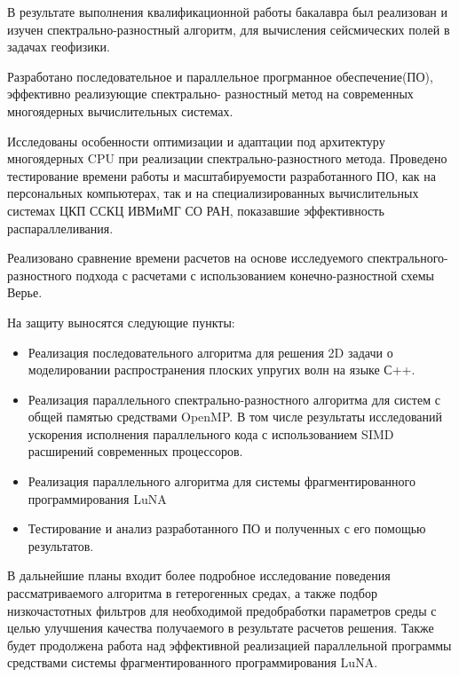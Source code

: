 
В результате выполнения квалификационной работы бакалавра был реализован и изучен спектрально-разностный алгоритм,
для вычисления сейсмических полей в задачах геофизики.

Разработано последовательное и параллельное прогрманное обеспечение(ПО), эффективно реализующие спектрально-
разностный метод на современных многоядерных вычислительных системах.

Исследованы особенности оптимизации и адаптации под архитектуру многоядерных CPU при реализации спектрально-разностного метода. Проведено тестирование времени работы и масштабируемости разработанного ПО, как на персональных компьютерах,
так и на специализированных вычислительных системах ЦКП ССКЦ ИВМиМГ СО РАН, показавшие эффективность распараллеливания.

Реализовано сравнение времени расчетов на основе исследуемого спектрального-разностного подхода с расчетами с использованием конечно-разностной схемы Верье. 


На защиту выносятся следующие пункты:

\begin{itemize}
    \item Реализация последовательного алгоритма для решения 2D задачи о моделировании
    распространения плоских упругих волн на языке С++.
    \item Реализация параллельного спектрально-разностного алгоритма для систем с общей памятью средствами OpenMP. В том числе
    результаты исследований ускорения исполнения параллельного кода с использованием SIMD расширений современных процессоров.
    \item Реализация параллельного алгоритма для системы фрагментированного программирования LuNA
    \item Тестирование и анализ разработанного ПО и полученных с его помощью результатов.
\end{itemize}

В дальнейшие планы входит более подробное исследование поведения рассматриваемого алгоритма в гетерогенных средах,
а также подбор низкочастотных фильтров для необходимой предобработки параметров среды с целью улучшения качества получаемого в результате расчетов решения.
Также будет продолжена работа над эффективной реализацией параллельной программы
средствами системы фрагментированного программирования LuNA.

\clearpage
